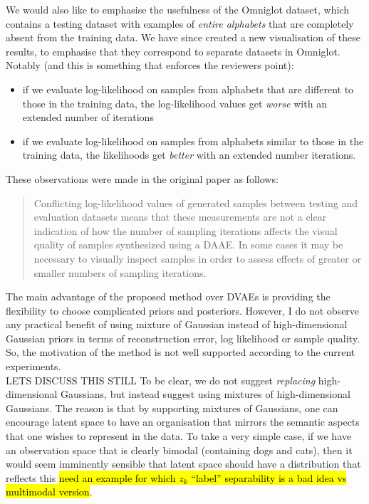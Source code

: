 \documentclass{article}
\begin{document}
We would also like to emphasise the usefulness of the Omniglot dataset, which contains a testing dataset with examples of {\em entire alphabets} that are completely absent from the training data. We have since created a new visualisation of these results, to emphasise that they correspond to separate datasets in Omniglot. Notably (and this is something that enforces the reviewers point):

\begin{itemize}
    \item if we evaluate log-likelihood on samples from alphabets that are different to those in the training data, the log-likelihood values get {\em worse} with an extended number of iterations
    \item if we evaluate log-likelihood on samples from alphabets similar to those in the training data, the likelihoods get {\em better} with an extended number iterations.
\end{itemize}

{\color{red} 
These observations were made in the original paper as follows:
 \begin{quote}
 Conflicting log-likelihood values of generated samples between testing and evaluation datasets means that these measurements are not a clear indication of how the number of sampling iterations affects the visual quality of samples synthesized using a DAAE. In some cases it may be necessary to visually inspect samples in order to assess effects of greater or smaller numbers of sampling iterations. 
 \end{quote}
}


{\color{blue}
The main advantage of the proposed method over DVAEs is providing the flexibility to choose complicated priors and posteriors. However, I do not observe any practical benefit of using mixture of Gaussian instead of high-dimensional Gaussian priors in terms of reconstruction error, log likelihood or sample quality. So, the motivation of the method is not well supported according to the current experiments.}\\


{\color{red} LETS DISCUSS THIS STILL}
To be clear, we do not suggest {\em replacing} high-dimensional Gaussians, but instead suggest using mixtures of high-dimensional Gaussians.  The reason is that by supporting mixtures of Gaussians, one can encourage latent space to have an organisation that mirrors the semantic aspects that one wishes to represent in the data.  To take a very simple case, if we have an observation space that is clearly bimodal (containing dogs and cats), then it would seem imminently sensible that latent space should have a distribution that reflects this \hl{need an example for which $z_k$ ``label'' separability is a bad idea vs multimodal version}.\\
\end{document}
